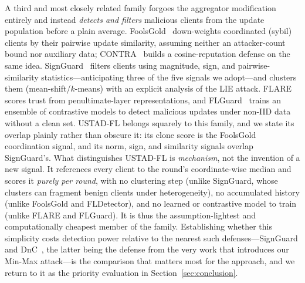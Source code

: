 \documentclass[journal]{IEEEtran}
\begin{document}
A third and most closely related family forgoes the aggregator modification entirely and instead \emph{detects and filters} malicious clients from the update population before a plain average. FoolsGold~\cite{fung2020foolsgold} down-weights coordinated (sybil) clients by their pairwise update similarity, assuming neither an attacker-count bound nor auxiliary data; CONTRA~\cite{awan2021contra} builds a cosine-reputation defense on the same idea. SignGuard~\cite{xu2022signguard} filters clients using magnitude, sign, and pairwise-similarity statistics---anticipating three of the five signals we adopt---and clusters them (mean-shift/$k$-means) with an explicit analysis of the LIE attack. FLARE~\cite{qian2024flare} scores trust from penultimate-layer representations, and FLGuard~\cite{lee2023flguard} trains an ensemble of contrastive models to detect malicious updates under non-IID data without a clean set. USTAD-FL belongs squarely to this family, and we state its overlap plainly rather than obscure it: its clone score is the FoolsGold coordination signal, and its norm, sign, and similarity signals overlap SignGuard's. What distinguishes USTAD-FL is \emph{mechanism}, not the invention of a new signal. It references every client to the round's coordinate-wise median and scores it \emph{purely per round}, with no clustering step (unlike SignGuard, whose clusters can fragment benign clients under heterogeneity), no accumulated history (unlike FoolsGold and FLDetector), and no learned or contrastive model to train (unlike FLARE and FLGuard). It is thus the assumption-lightest and computationally cheapest member of the family. Establishing whether this simplicity costs detection power relative to the nearest such defenses---SignGuard and DnC~\cite{shejwalkar2021manipulating}, the latter being the defense from the very work that introduces our Min-Max attack---is the comparison that matters most for the approach, and we return to it as the priority evaluation in Section~\ref{sec:conclusion}.
\end{document}
